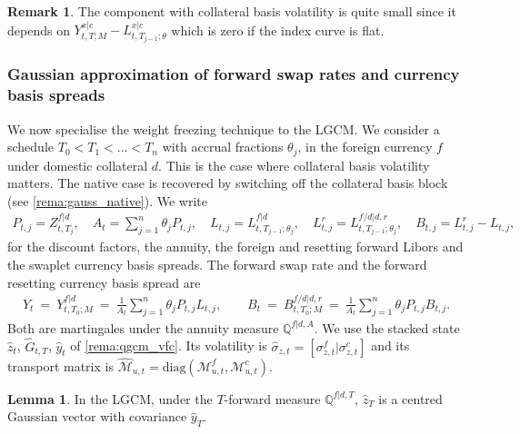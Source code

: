 \documentclass[11pt,english]{amsart}
\newcommand{\diag}{\mathrm{diag}}
\newcommand{\QQ}{\mathbb{Q}}
\theoremstyle{definition}
\newtheorem{lemm}{Lemma}
\newtheorem{rema}{Remark}
\begin{document}
\begin{rema}
The component with collateral basis volatility is quite small since it depends on $Y^{x|c}_{t,T;M} - L^{x|c}_{t,T_{j-1};\theta}$ which is zero if the index curve is flat. 
\end{rema}

\newpage%
\subsubsection{Gaussian approximation of forward swap rates and currency basis spreads}\label{sssec:lgcm_gaussian_approx}

We now specialise the weight freezing technique to the LGCM. We consider a schedule $T_0 < T_1 < \ldots < T_n$ with accrual fractions $\theta_j$, in the foreign currency $f$ under domestic collateral $d$. This is the case where collateral basis volatility matters. The native case is recovered by switching off the collateral basis block (see \autoref{rema:gauss_native}). We write
\begin{eqnarray*}
  P_{t,j} = Z^{f|d}_{t,T_j}, \quad
  A_{t} = \sum_{j=1}^n \theta_j P_{t,j}, \quad
  L_{t,j} = L^{f|d}_{t,T_{j-1};\theta_j}, \quad
  L^{r}_{t,j} = L^{f/d|d,r}_{t,T_{j-1};\theta_j}, \quad
  B_{t,j} = L^{r}_{t,j} - L_{t,j} ,
\end{eqnarray*}
for the discount factors, the annuity, the foreign and resetting forward Libors and the swaplet currency basis spreads. The forward swap rate and the forward resetting currency basis spread are
\begin{eqnarray}
  Y_t ~=~ Y^{f|d}_{t,T_0;M} ~=~ \frac{1}{A_t}\sum_{j=1}^n \theta_j P_{t,j} L_{t,j} , \qquad
  B_t ~=~ B^{f/d|d,r}_{t,T_0;M} ~=~ \frac{1}{A_t}\sum_{j=1}^n \theta_j P_{t,j} B_{t,j} .
\end{eqnarray}
Both are martingales under the annuity measure $\QQ^{f|d,A}$. We use the stacked state $\hat{z}_t$, $\hat{G}_{t,T}$, $\hat{y}_t$ of \autoref{rema:qgcm_vfc}. Its volatility is $\hat{\sigma}_{z,t} = [\sigma^f_{z,t}|\sigma^c_{z,t}]$ and its transport matrix is $\hat{\mathcal{M}}_{u,t} = \diag(\mathcal{M}^f_{u,t},\mathcal{M}^c_{u,t})$.

\begin{lemm}\label{lemm:zhat_forward_law}
In the LGCM, under the $T$-forward measure $\QQ^{f|d,T}$, $\hat{z}_T$ is a centred Gaussian vector with covariance $\hat{y}_T$.
\end{lemm}
\end{document}
